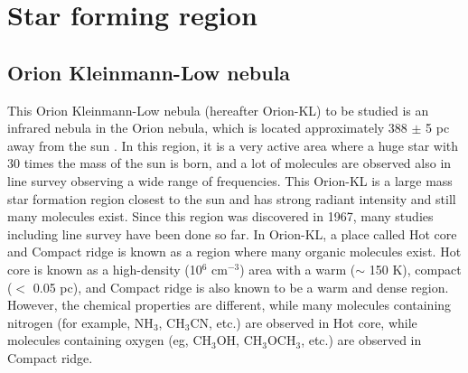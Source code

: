
\newpage
\section{Star forming region}
\subsection{Orion Kleinmann-Low nebula}
This Orion Kleinmann-Low nebula (hereafter Orion-KL) to be studied is an infrared nebula 
in the Orion nebula, which is located approximately 388 $\pm$ 5  pc away from the sun \citep{Kounkel+2017}. 
In this region, it is a very active area where a huge star with 30 times the mass of the sun is born, and a lot of molecules are observed also in line survey observing a wide range of frequencies. 
This Orion-KL is a large mass star formation region closest to the sun and has strong radiant intensity and still many molecules exist. Since this region was discovered in 1967,  many studies including line survey have been done so far.
In Orion-KL, a place called Hot core and Compact ridge is known as a region where many organic molecules exist. Hot core is known as a high-density (10$^6$ cm$^{-3}$) area with a warm ($\sim$ 150 K), compact ($<$ 0.05 pc), and Compact ridge is also known to be a warm and dense region. 
However, the chemical properties are different, while many molecules containing nitrogen (for example, NH$_3$, CH$_3$CN, etc.) are observed in Hot core, while molecules containing oxygen (eg, CH$_3$OH, CH$_3$OCH$_3$, etc.) are observed in Compact ridge.


